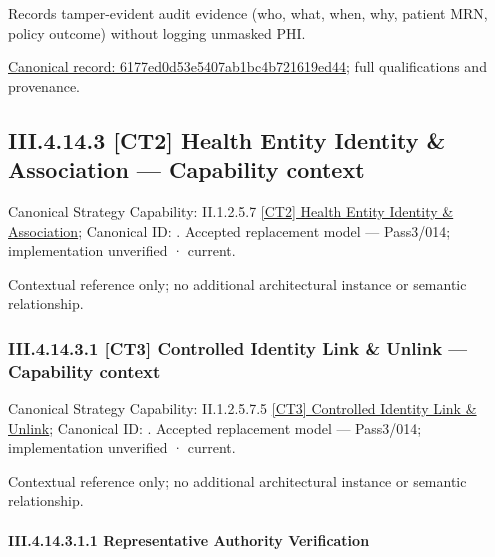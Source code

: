 Records tamper-evident audit evidence (who, what, when, why, patient MRN, policy outcome) without logging unmasked PHI.


{\footnotesize \href{../../../../../../../../continuum/business/business-function/6177ed0d53e5407ab1bc4b721619ed44.md}{Canonical record: 6177ed0d53e5407ab1bc4b721619ed44}; full qualifications and provenance.}\par
\subsection*{III.4.14.3 [CT2] Health Entity Identity \& Association — Capability context}
\label{navigation:III.4.14.3}

{\small Canonical Strategy Capability: II.1.2.5.7 \hyperref[element:7cbb4c6253164e19ab3a126c8f176f21]{[CT2] Health Entity Identity \& Association}; Canonical ID: \texttt{}. Accepted replacement model — Pass3/014; implementation unverified · current.}\par
Contextual reference only; no additional architectural instance or semantic relationship.\par
\subsubsection*{III.4.14.3.1 [CT3] Controlled Identity Link \& Unlink — Capability context}
\label{navigation:III.4.14.3.1}

{\small Canonical Strategy Capability: II.1.2.5.7.5 \hyperref[element:34f95770622e4077a87a669f9b279019]{[CT3] Controlled Identity Link \& Unlink}; Canonical ID: \texttt{}. Accepted replacement model — Pass3/014; implementation unverified · current.}\par
Contextual reference only; no additional architectural instance or semantic relationship.\par
\paragraph*{III.4.14.3.1.1 Representative Authority Verification}
\label{navigation:III.4.14.3.1.1}

